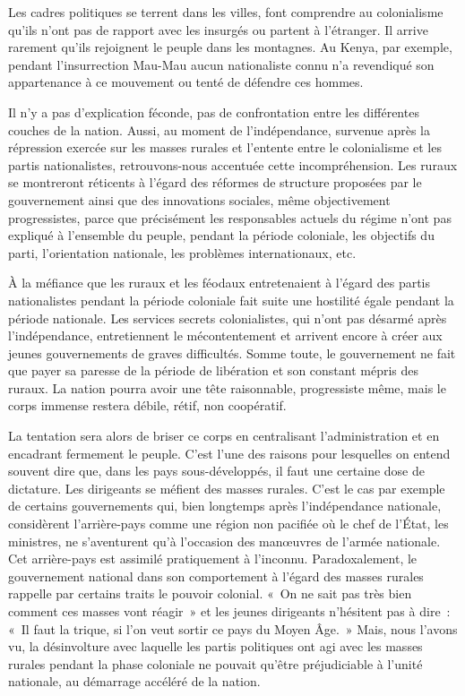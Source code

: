 \documentclass[french,twoside]{book} %
\begin{document}
Les cadres politiques se terrent dans les villes, font comprendre au colonialisme qu’ils n’ont pas de rapport avec les insurgés ou partent à l’étranger. Il arrive rarement qu’ils rejoignent le peuple dans les montagnes. Au Kenya, par exemple, pendant l’insurrection Mau-Mau aucun nationaliste connu n’a revendiqué son appartenance à ce mouvement ou tenté de défendre ces hommes.\par
Il n’y a pas d’explication féconde, pas de confrontation entre les différentes couches de la nation. Aussi, au moment de l’indépendance, survenue après la répression exercée sur les masses rurales et l’entente entre le colonialisme et les partis nationalistes, retrouvons-nous accentuée cette incompréhension. Les ruraux se montreront réticents à l’égard des réformes de structure proposées par le gouvernement ainsi que des innovations sociales, même objectivement progressistes, parce que précisément les responsables actuels du régime n’ont pas expliqué à l’ensemble du peuple, pendant la période coloniale, les objectifs   du parti, l’orientation nationale, les problèmes internationaux, etc.\par
\bigbreak
\noindent À la méfiance que les ruraux et les féodaux entretenaient à l’égard des partis nationalistes pendant la période coloniale fait suite une hostilité égale pendant la période nationale. Les services secrets colonialistes, qui n’ont pas désarmé après l’indépendance, entretiennent le mécontentement et arrivent encore à créer aux jeunes gouvernements de graves difficultés. Somme toute, le gouvernement ne fait que payer sa paresse de la période de libération et son constant mépris des ruraux. La nation pourra avoir une tête raisonnable, progressiste même, mais le corps immense restera débile, rétif, non coopératif.\par
La tentation sera alors de briser ce corps en centralisant l’administration et en encadrant fermement le peuple. C’est l’une des raisons pour lesquelles on entend souvent dire que, dans les pays sous-développés, il faut une certaine dose de dictature. Les dirigeants se méfient des masses rurales. C’est le cas par exemple de certains gouvernements qui, bien longtemps après l’indépendance nationale, considèrent l’arrière-pays comme une région non pacifiée où le chef de l’État, les ministres, ne s’aventurent qu’à l’occasion des manœuvres de l’armée nationale. Cet arrière-pays est assimilé pratiquement à l’inconnu. Paradoxalement, le gouvernement national dans son comportement à l’égard des masses rurales rappelle par certains traits le pouvoir colonial. « On ne sait pas très bien comment ces masses vont réagir » et les jeunes dirigeants n’hésitent pas à dire : « Il faut la trique, si l’on veut sortir ce pays du Moyen Âge. » Mais, nous l’avons vu, la désinvolture avec laquelle les partis politiques ont agi avec les masses rurales pendant la phase coloniale ne pouvait qu’être préjudiciable à l’unité nationale, au démarrage accéléré de la nation.\par
\end{document}
